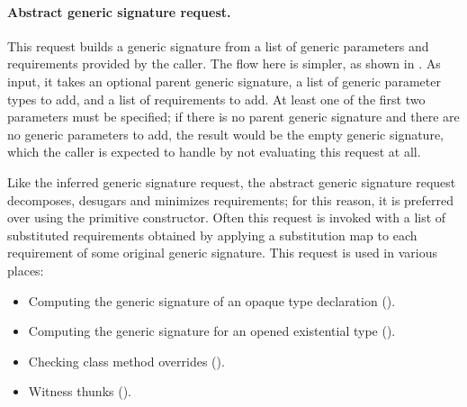 \documentclass[../generics]{subfiles}
\begin{document}
\begin{figure}\label{abstract generic signature request figure}
\begin{center}
\end{center}
\end{figure}

\paragraph{Abstract generic signature request.}
This request builds a generic signature from a list of generic parameters and requirements provided by the caller. The flow here is simpler, as shown in . As input, it takes an optional parent generic signature, a list of generic parameter types to add, and a list of requirements to add. At least one of the first two parameters must be specified; if there is no parent generic signature and there are no generic parameters to add, the result would be the empty generic signature, which the caller is expected to handle by not evaluating this request at all.

Like the inferred generic signature request, the abstract generic signature request decomposes, desugars and minimizes requirements; for this reason, it is preferred over using the primitive constructor. Often this request is invoked with a list of substituted requirements obtained by applying a substitution map to each requirement of some original generic signature. This request is used in various places:
\begin{itemize}
\item Computing the generic signature of an opaque type declaration ().
\item Computing the generic signature for an opened existential type ().
\item Checking class method overrides ().
\item Witness thunks ().
\end{itemize}
\end{document}
